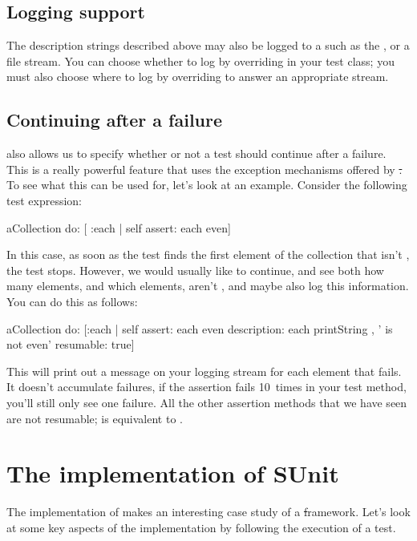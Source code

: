 \documentclass[a4paper,10pt,twoside]{book}
\begin{document}
\subsection{Logging support}
The description strings described above may also be logged to a
 such as the , or a file stream.
You can choose whether to log by overriding
 in your test class; you must also choose where
to log by overriding  to answer an appropriate stream.

\subsection{Continuing after a failure}
\sunit also allows us to specify whether or not a test should continue after a failure.  This is a really
powerful feature that uses the exception mechanisms offered
by \st.  To see what this can be used for, let's look at an
example. Consider the following test expression:
\begin{code}{}
aCollection do: [ :each | self assert: each even]
\end{code}
In this case, as soon as the test finds the first element of the collection that isn't
, the test stops. 
However, we would usually like to
continue, and see both how many elements, and which elements, aren't
, and maybe also log this information.  You can do this
as follows:
\begin{code}{}
aCollection do:
	[:each |
	self
		assert: each even
		description: each printString , ' is not even'
		resumable: true]
\end{code}
This will print out a message on your logging stream for each element
that fails.  It doesn't accumulate failures, \ie if the assertion
fails 10~times in your test method, you'll still only see one failure.
All the other assertion methods that we have seen are not resumable;
 is equivalent to .
\section{The implementation of SUnit}

The implementation of \sunit makes an interesting case study of a \st framework.
Let's look at some key aspects of the implementation by following the
execution of a test.
\end{document}
